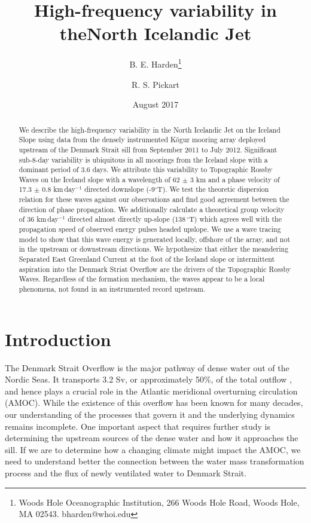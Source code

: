 \documentclass[12pt,titlepage,figuresatend]{article}
\title{High-frequency variability in the\authorcr North Icelandic Jet}
\author{B. E. Harden\footnote{Woods Hole Oceanographic Institution, 266 Woods Hole Road, Woods Hole, MA 02543. bharden@whoi.edu}}
\author{R. S. Pickart}
\affil{Woods Hole Oceanographic Institution, Woods Hole, USA}
\date{August 2017}
\begin{document}
\maketitle

\begin{abstract}
We describe the high-frequency variability in the North Icelandic Jet on the Iceland Slope using data from the densely instrumented K\"{o}gur mooring array deployed upstream of the Denmark Strait sill from September 2011 to July 2012. Significant sub-8-day variability is ubiquitous in all moorings from the Iceland slope with a dominant period of 3.6 days. We attribute this variability to Topographic Rossby Waves on the Iceland slope with a wavelength of 62 $\pm$ 3 km and a phase velocity of 17.3 $\pm$ 0.8 km$\,$day$^{-1}$ directed downslope (-9$^{\circ}$T). We test the theoretic dispersion relation for these waves against our observations and find good agreement between the direction of phase propagation. We additionally calculate a theoretical group velocity of 36 km$\,$day$^{-1}$ directed almost directly up-slope (138$\,^{\circ}$T) which agrees well with the propagation speed of observed energy pulses headed upslope. We use a wave tracing model to show that this wave energy is generated locally, offshore of the array, and not in the upstream or downstream directions. We hypothesize that either the meandering Separated East Greenland Current at the foot of the Iceland slope or intermittent aspiration into the Denmark Striat Overflow are the drivers of the Topographic Rossby Waves. Regardless of the formation mechanism, the waves appear to be a local phenomena, not found in an instrumented record upstream.

\end{abstract}

\section{Introduction}

The Denmark Strait Overflow is the major pathway of dense water out of the Nordic Seas. It transports 3.2 Sv, or approximately 50\%, of the total outflow \cite[]{Dickson1994,Jochumsen2017}, and hence plays a crucial role in the Atlantic meridional overturning circulation (AMOC). While the existence of this overflow has been known for many decades, our understanding of the processes that govern it and the underlying dynamics remains incomplete. One important aspect that requires further study is determining the upstream sources of the dense water and how it approaches the sill. If we are to determine how a changing climate might impact the AMOC, we need to understand better the connection between the water mass transformation process and the flux of newly ventilated water to Denmark Strait. 
\end{document}
